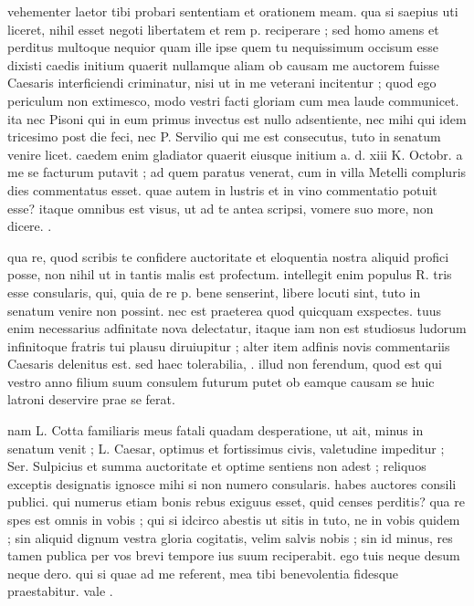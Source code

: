 


 vehementer laetor tibi probari sententiam et orationem meam. qua si saepius uti liceret, nihil esset negoti libertatem et rem p. reciperare ; sed homo amens et perditus multoque nequior quam ille ipse quem tu nequissimum occisum esse dixisti caedis initium quaerit nullamque aliam ob causam me auctorem fuisse Caesaris interficiendi criminatur, nisi ut in me veterani incitentur ; quod ego periculum non extimesco, modo vestri facti gloriam cum mea laude communicet. ita nec Pisoni qui in eum primus invectus est nullo adsentiente, nec mihi qui idem tricesimo post die feci, nec P. Servilio qui me est consecutus, tuto in senatum venire licet. caedem enim gladiator quaerit eiusque initium a. d. xiii K. Octobr. a me se facturum putavit ; ad quem paratus venerat, cum in villa Metelli compluris dies commentatus esset. quae autem in lustris et in vino commentatio potuit esse? itaque omnibus est visus, ut ad te antea scripsi, vomere suo more, non dicere. .

 qua re, quod scribis te confidere auctoritate et eloquentia nostra aliquid profici posse, non nihil ut in tantis malis est profectum. intellegit enim populus R. tris esse consularis, qui, quia de re p. bene senserint, libere locuti sint, tuto in senatum venire non possint. nec est praeterea quod quicquam exspectes. tuus enim necessarius adfinitate nova delectatur, itaque iam non est studiosus ludorum infinitoque fratris tui plausu diruiupitur ; alter item adfinis novis commentariis Caesaris delenitus est. sed haec tolerabilia, . illud non ferendum, quod est qui vestro anno filium suum consulem futurum putet ob eamque causam se huic latroni deservire prae se ferat.

 nam L. Cotta familiaris meus fatali quadam desperatione, ut ait, minus in senatum venit ; L. Caesar, optimus et fortissimus civis, valetudine impeditur ; Ser. Sulpicius et summa auctoritate et optime sentiens non adest ; reliquos exceptis designatis ignosce mihi si non numero consularis. habes auctores consili publici. qui numerus etiam bonis rebus exiguus esset, quid censes perditis? qua re spes est omnis in vobis ; qui si idcirco abestis ut sitis in tuto, ne in vobis quidem ; sin aliquid dignum vestra gloria cogitatis, velim salvis nobis ; sin id minus, res tamen publica per vos brevi tempore ius suum reciperabit. ego tuis neque desum neque dero. qui si quae ad me referent, mea tibi benevolentia fidesque praestabitur. vale .
